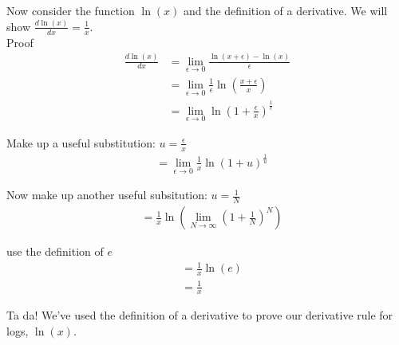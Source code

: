 \documentclass{article}
\begin{document}
Now consider the function $\ln(x)$ and the definition of a derivative. We will show $\frac{d \ln(x)}{dx} = \frac{1}{x}$.\\

Proof
\begin{align}
    \frac{d \ln(x)}{dx} &= \lim_{\epsilon \to 0} \frac{\ln(x+\epsilon) - \ln(x)}{\epsilon} \\
    &= \lim_{\epsilon \to 0} \frac{1}{\epsilon} \ln\left(\frac{x+\epsilon}{x}\right) \\
    &= \lim_{\epsilon \to 0} \ln\left(1+ \frac{\epsilon}{x}\right)^{\frac{1}{\epsilon}}
\end{align}

Make up a useful substitution: $u = \frac{\epsilon}{x}$
\begin{align}
    &= \lim_{\epsilon \to 0} \frac{1}{x} \ln\left(1+ u \right)^{\frac{1}{u}}
\end{align}

Now make up another useful subsitution: $u = \frac{1}{N}$
\begin{align}
    &= \frac{1}{x} \ln\left(\lim_{N \to \infty}  \left(1+ \frac{1}{N}\right)^N\right)
\end{align}

use the definition of $e$ 
\begin{align}
    &= \frac{1}{x} \ln(e)\\
    &= \frac{1}{x}
\end{align}

Ta da! We've used the definition of a derivative to prove our derivative rule for logs, $\ln(x)$. 
\end{document}

